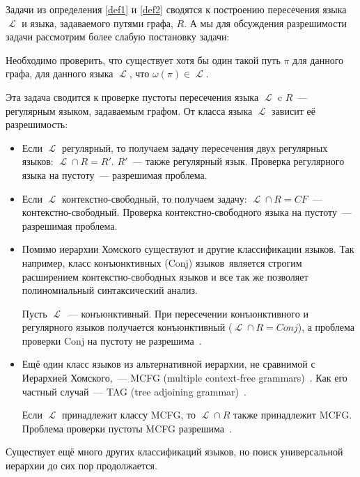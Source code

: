 Задачи из определения \ref{def1} и \ref{def2} сводятся к построению пересечения языка $\mscrL$ и языка, задаваемого путями графа, $R$.
А мы для обсуждения разрешимости задачи рассмотрим более слабую постановку задачи:

\begin{definition}
    Необходимо проверить, что существует хотя бы один такой путь $\pi$ для данного графа, для данного языка $\mscrL$, что $\omega(\pi) \in \mscrL$.
\end{definition}

Эта задача сводится к проверке пустоты пересечения языка $\mscrL$ c $R$~--- регулярным языком, задаваемым графом.
От класса языка $\mscrL$ зависит её разрешимость:
\begin{itemize}
    \item Если $\mscrL$ регулярный, то получаем задачу пересечения двух регулярных языков: $\mscrL \cap R = R'$.
          $R'$~--- также регулярный язык.
          Проверка регулярного языка на пустоту~--- разрешимая проблема.
    \item Если $\mscrL$ контекстно-свободный, то получаем задачу: $\mscrL \cap R = CF$~--- контекстно-свободный.
          Проверка контекстно-свободного языка на пустоту~--- разрешимая проблема.
    \item Помимо иерархии Хомского существуют и другие классификации языков.
          Так например, класс конъюнктивных (Conj) языков~является строгим расширением контекстно-свободных языков и все так же позволяет полиномиальный синтаксический анализ.

          Пусть $\mscrL$~--- конъюнктивный.
          При пересечении конъюнктивного и регулярного языков получается конъюнктивный ($\mscrL \cap R = Conj$), а проблема проверки Conj на пустоту не разрешима~.
    \item Ещё один класс языков из альтернативной иерархии, не сравнимой с Иерархией Хомского,~--- MCFG (multiple context-free grammars)~.
          Как его частный случай~--- TAG (tree adjoining grammar)~.

          Если $\mscrL$ принадлежит классу MCFG, то $\mscrL \cap R$ также принадлежит MCFG.
          Проблема проверки пустоты MCFG разрешима~.
\end{itemize}

Существует ещё много других классификаций языков, но поиск универсальной иерархии до сих пор продолжается.

